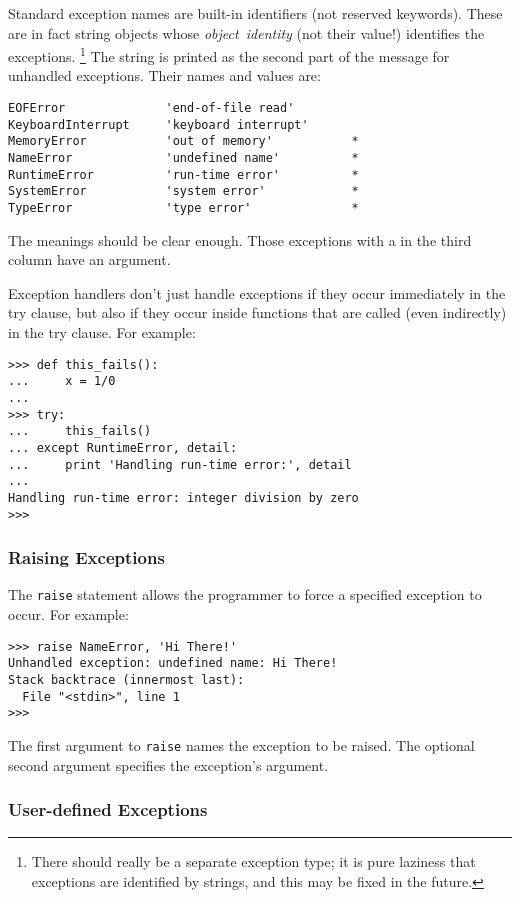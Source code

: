 Standard exception names are built-in identifiers (not reserved
keywords).
These are in fact string objects whose
{\em object\ identity}
(not their value!) identifies the exceptions.%
\footnote{
	There should really be a separate exception type; it is pure
	laziness that exceptions are identified by strings, and this may
	be fixed in the future.
}
The string is printed as the second part of the message for unhandled
exceptions.
Their names and values are:
\bcode\begin{verbatim}
EOFError              'end-of-file read'
KeyboardInterrupt     'keyboard interrupt'
MemoryError           'out of memory'           *
NameError             'undefined name'          *
RuntimeError          'run-time error'          *
SystemError           'system error'            *
TypeError             'type error'              *
\end{verbatim}\ecode
The meanings should be clear enough.
Those exceptions with a {\tt *} in the third column have an argument.

Exception handlers don't just handle exceptions if they occur
immediately in the try clause, but also if they occur inside functions
that are called (even indirectly) in the try clause.
For example:
\bcode\begin{verbatim}
>>> def this_fails():
...     x = 1/0
... 
>>> try:
...     this_fails()
... except RuntimeError, detail:
...     print 'Handling run-time error:', detail
... 
Handling run-time error: integer division by zero
>>> 
\end{verbatim}\ecode

\subsubsection{Raising Exceptions}

The {\tt raise} statement allows the programmer to force a specified
exception to occur.
For example:
\bcode\begin{verbatim}
>>> raise NameError, 'Hi There!'
Unhandled exception: undefined name: Hi There!
Stack backtrace (innermost last):
  File "<stdin>", line 1
>>> 
\end{verbatim}\ecode
The first argument to {\tt raise} names the exception to be raised.
The optional second argument specifies the exception's argument.

\subsubsection{User-defined Exceptions}

